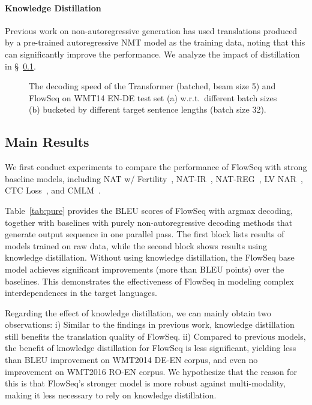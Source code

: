 \documentclass[11pt,a4paper]{article}
\begin{document}
\paragraph{Knowledge Distillation}
Previous work on non-autoregressive generation \citep{gu2018non,constant2019} has used translations produced by a pre-trained autoregressive NMT model as the training data, noting that this can significantly improve the performance.
We analyze the impact of distillation in \S~\ref{subsec:result}.

\begin{figure*}[t]
  \centering
  \begin{minipage}[t]{1.0\textwidth}
  \end{minipage}
  \caption{The decoding speed of the Transformer (batched, beam size 5) and FlowSeq on WMT14 EN-DE test set (a) w.r.t.~different batch sizes (b) bucketed by different target sentence lengths (batch size 32).}
  \label{fig:speed}
  \vspace{-4mm}
\end{figure*}

\subsection{Main Results}\label{subsec:result}
We first conduct experiments to compare the performance of FlowSeq with strong baseline models, including NAT w/ Fertility~\cite{gu2018non}, NAT-IR~\cite{lee2018deterministic}, NAT-REG~\cite{wang2019non}, LV NAR~\cite{shu2019latent}, CTC Loss~\cite{libovicky2018end}, and CMLM~\cite{constant2019}.

Table~\ref{tab:pure} provides the BLEU scores of FlowSeq with argmax decoding, together with baselines with purely non-autoregressive decoding methods that generate output sequence in one parallel pass.
The first block lists results of models trained on raw data, while the second block shows results using knowledge distillation.
Without using knowledge distillation, the FlowSeq base model achieves significant improvements (more than  BLEU points) over the baselines.
This demonstrates the effectiveness of FlowSeq in modeling complex interdependences in the target languages.

Regarding the effect of knowledge distillation, we can mainly obtain two observations: i)
Similar to the findings in previous work, knowledge distillation still benefits the translation quality of FlowSeq. 
ii) Compared to previous models, the benefit of knowledge distillation for FlowSeq is less significant, yielding less than  BLEU improvement on WMT2014 DE-EN corpus, and even no improvement on WMT2016 RO-EN corpus.
We hypothesize that the reason for this is that FlowSeq's stronger model is more robust against multi-modality, making it less necessary to rely on knowledge distillation.
\end{document}
